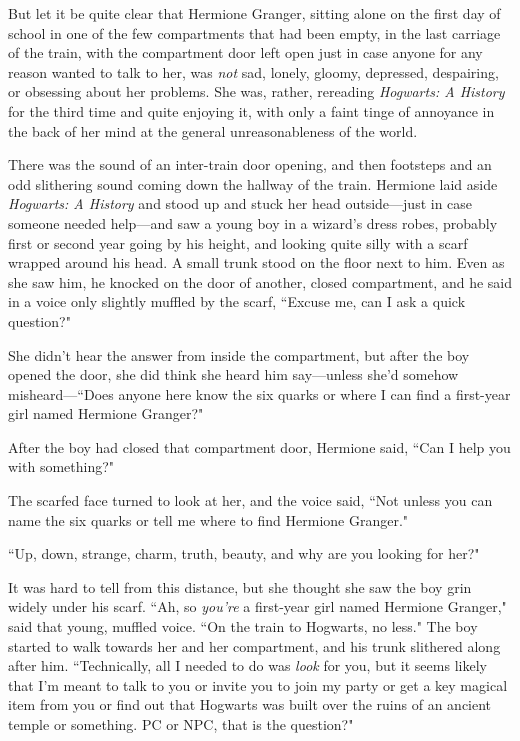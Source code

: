 But let it be quite clear that Hermione Granger, sitting alone on the first day of school in one of the few compartments that had been empty, in the last carriage of the train, with the compartment door left open just in case anyone for any reason wanted to talk to her, was \emph{not} sad, lonely, gloomy, depressed, despairing, or obsessing about her problems. She was, rather, rereading \emph{Hogwarts: A History} for the third time and quite enjoying it, with only a faint tinge of annoyance in the back of her mind at the general unreasonableness of the world.

There was the sound of an inter-train door opening, and then footsteps and an odd slithering sound coming down the hallway of the train. Hermione laid aside \emph{Hogwarts: A History} and stood up and stuck her head outside---just in case someone needed help---and saw a young boy in a wizard's dress robes, probably first or second year going by his height, and looking quite silly with a scarf wrapped around his head. A small trunk stood on the floor next to him. Even as she saw him, he knocked on the door of another, closed compartment, and he said in a voice only slightly muffled by the scarf, ``Excuse me, can I ask a quick question?"

She didn't hear the answer from inside the compartment, but after the boy opened the door, she did think she heard him say---unless she'd somehow misheard---``Does anyone here know the six quarks or where I can find a first-year girl named Hermione Granger?"

After the boy had closed that compartment door, Hermione said, ``Can I help you with something?"

The scarfed face turned to look at her, and the voice said, ``Not unless you can name the six quarks or tell me where to find Hermione Granger."

``Up, down, strange, charm, truth, beauty, and why are you looking for her?"

It was hard to tell from this distance, but she thought she saw the boy grin widely under his scarf. ``Ah, so \emph{you're} a first-year girl named Hermione Granger," said that young, muffled voice. ``On the train to Hogwarts, no less." The boy started to walk towards her and her compartment, and his trunk slithered along after him. ``Technically, all I needed to do was \emph{look} for you, but it seems likely that I'm meant to talk to you or invite you to join my party or get a key magical item from you or find out that Hogwarts was built over the ruins of an ancient temple or something. PC or NPC, that is the question?"

